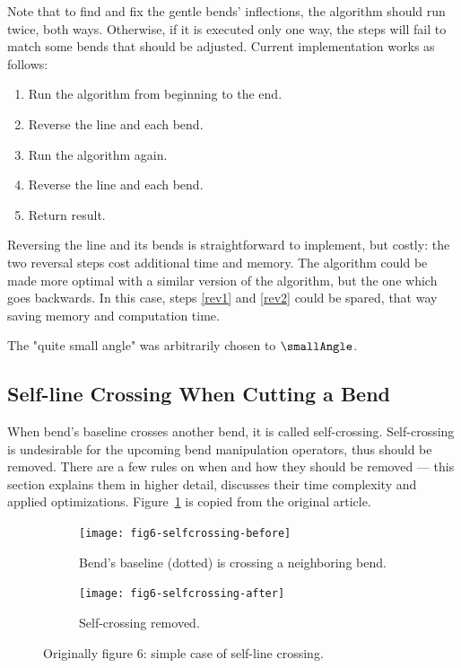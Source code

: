 \documentclass[a4paper]{article}
\begin{document}
Note that to find and fix the gentle bends' inflections, the algorithm should
run twice, both ways. Otherwise, if it is executed only one way, the steps will
fail to match some bends that should be adjusted. Current implementation works
as follows:

\begin{enumerate}
    \item Run the algorithm from beginning to the end.
    \item \label{rev1} Reverse the line and each bend.
    \item Run the algorithm again.
    \item \label{rev2} Reverse the line and each bend.
    \item Return result.
\end{enumerate}

Reversing the line and its bends is straightforward to implement, but costly:
the two reversal steps cost additional time and memory. The algorithm could be
made more optimal with a similar version of the algorithm, but the one which
goes backwards. In this case, steps \ref{rev1} and \ref{rev2} could be spared,
that way saving memory and computation time.

The "quite small angle" was arbitrarily chosen to $\smallAngle$.

\subsection{Self-line Crossing When Cutting a Bend}

When bend's baseline crosses another bend, it is called self-crossing.
Self-crossing is undesirable for the upcoming bend manipulation operators, thus
should be removed. There are a few rules on when and how they should be removed
--- this section explains them in higher detail, discusses their time
complexity and applied optimizations. Figure~\ref{fig:fig6-selfcrossing} is
copied from the original article.

\begin{figure}[ht]
    \centering
    \begin{subfigure}[b]{.49\textwidth}
        \texttt{[image: fig6-selfcrossing-before]}
        \caption{Bend's baseline (dotted) is crossing a neighboring bend.}
    \end{subfigure}
    \hfill
    \begin{subfigure}[b]{.49\textwidth}
        \texttt{[image: fig6-selfcrossing-after]}
        \caption{Self-crossing removed.}
    \end{subfigure}
    \caption{Originally figure 6: simple case of self-line crossing.}
    \label{fig:fig6-selfcrossing}
\end{figure}
\end{document}
